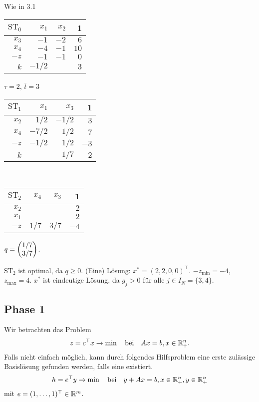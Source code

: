 \begin{exmp}
  Wie in 3.1 \\[1.5em]
  \begin{tabular}{r|rrr}
    $\mathrm{ST}_0$ & $x_1$ & $x_2$ & 1 \\
    \hline
    $x_3$ & $-1$ & $-2$ & $6$ \\
    $x_4$ & $-4$ & $-1$ & $10$ \\
    \hline
    $-z$ & $-1$ & $-1$ & $0$ \\
    \hline
    $k$ & $-1/2$ & & $3$
  \end{tabular}
  \hspace{1cm}
  $\tau = 2$, $\bar{t} = 3$ \\[1.5em]
  \begin{tabular}{r|rrr}
    $\mathrm{ST}_1$ & $x_1$ & $x_3$ & 1 \\
    \hline
    $x_2$ & $1/2$ & $-1/2$ & $3$ \\
    $x_4$ & $-7/2$ & $1/2$ & $7$ \\
    \hline
    $-z$ & $-1/2$ & $1/2$ & $-3$ \\
    \hline
    $k$ & & $1/7$ & $2$
  \end{tabular} \\[1.5em]
  \begin{tabular}{r|rrr}
    $\mathrm{ST}_2$ & $x_4$ & $x_3$ & 1 \\
    \hline
    $x_2$ & & & $2$ \\
    $x_1$ & & & $2$ \\
    \hline
    $-z$ & $1/7$ & $3/7$ & $-4$
  \end{tabular}
  \hspace{1cm}
  $q = \begin{pmatrix}1/7 \\ 3/7\end{pmatrix}$.

  $\mathrm{ST}_2$ ist optimal, da $q \ge 0$. (Eine) Lösung: $x^* = (2,2,0,0)^\top$.
  $-z_{\min} = -4$, $z_{\max} = 4$. $x^*$ ist eindeutige Lösung, da $g_j > 0$
  für alle $j \in I_N = \{3,4\}$.
\end{exmp}

\subsection{Phase 1}
Wir betrachten das Problem
\begin{equation} %
  z = c^\top x \to \min \subjto Ax = b, x \in \real^n_+.
\end{equation}
Falls nicht einfach möglich, kann durch folgendes Hilfsproblem eine erste
zulässige Basislösung gefunden werden, falls eine existiert.
\begin{equation} %
  h = e^\top y \to \min \subjto y + Ax = b, x \in \real^n_+, y \in \real^n_+
\end{equation}
mit $e =(1, \ldots, 1)^\top \in \mathbb{R}^m$.

